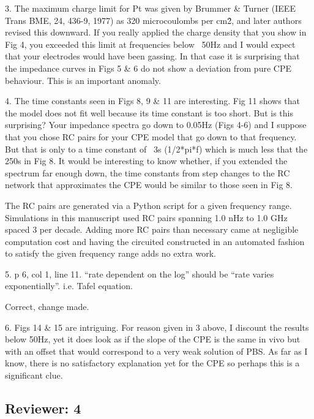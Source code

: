 \documentclass[journal, a4paper]{IEEEtran}
\begin{document}
{    3. The maximum charge limit for Pt was given by Brummer \& Turner (IEEE Trans BME, 24, 436-9, 1977) as 320 microcoulombs per cm\^2, and later authors revised this downward. If you really applied the charge density that you show in Fig 4, you exceeded this limit at frequencies below ~50Hz and I would expect that your electrodes would have been gassing. In that case it is surprising that the impedance curves in Figs 5 \& 6 do not show a deviation from pure CPE behaviour. This is an important anomaly.

    {
        \color{blue}

    }

    4. The time constants seen in Figs 8, 9 \& 11 are interesting. Fig 11 shows that the model does not fit well because its time constant is too short. But is this surprising? Your impedance spectra go down to 0.05Hz (Figs 4-6) and I suppose that you chose RC pairs for your CPE model that go down to that frequency. But that is only to a time constant of ~3s (1/2*pi*f) which is much less that the 250s in Fig 8. It would be interesting to know whether, if you extended the spectrum far enough down, the time constants from step changes to the RC network that approximates the CPE would be similar to those seen in Fig 8.

    {
        \color{blue}
        The RC pairs are generated via a Python script for a given frequency range. Simulations in this manuscript used RC pairs spanning 1.0 nHz to 1.0 GHz spaced 3 per decade. Adding more RC pairs than necessary came at negligible computation cost and having the circuited constructed in an automated fashion to satisfy the given frequency range adds no extra work.
    }

    5. p 6, col 1, line 11. ``rate dependent on the log'' should be ``rate varies exponentially''. i.e. Tafel equation.

    {
        \color{blue}
        Correct, change made.
    }

    6. Figs 14 \& 15 are intriguing. For reason given in 3 above, I discount the results below 50Hz, yet it does look as if the slope of the CPE is the same in vivo but with an offset that would correspond to a very weak solution of PBS. As far as I know, there is no satisfactory explanation yet for the CPE so perhaps this is a significant clue.
}

\subsection*{Reviewer: 4}
\end{document}
